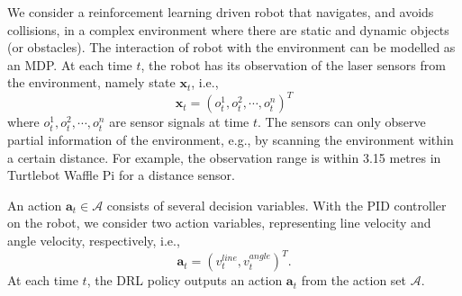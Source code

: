 \begin{example}\label{example:robotnavigation}
We consider 
a reinforcement learning driven robot 
that 
navigates, and avoids collisions, in a complex environment where there are static and dynamic objects (or obstacles).  %
%
%
The interaction of robot with the environment 
can be modelled as an MDP. At each time $t$, %
the robot has its observation of the laser sensors from the environment, namely state $\textbf{x}_t$, i.e.,  
	\begin{equation}\label{states}
		\textbf{x}_t = (o^1_t,o^2_t,\cdots,o^n_t)^T
	\end{equation}
where 
$o^1_t,o^2_t,\cdots,o^n_t$ are 
sensor signals at time $t$. 
The sensors can only observe partial information of the environment, e.g., by scanning the environment within a certain distance. For example, the observation range is within 3.15 metres in Turtlebot Waffle Pi \cite{name} for a distance sensor. 

An action $\textbf{a}_t\in\mathcal{A}$ consists of several decision variables.
With the PID controller on the 
robot, %
we consider two  action variables, representing line velocity and angle velocity, respectively, i.e., 
\begin{equation}
    \textbf{a}_t = (v^{line}_t, v^{angle}_t)^T.
\end{equation}
At each time $t$, the DRL policy outputs an action $\textbf{a}_t$ from the action set $\mathcal{A}$.



\end{example}
